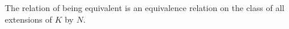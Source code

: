 The relation of being equivalent is an equivalence relation on the class of all extensions of $K$ by $N$.
